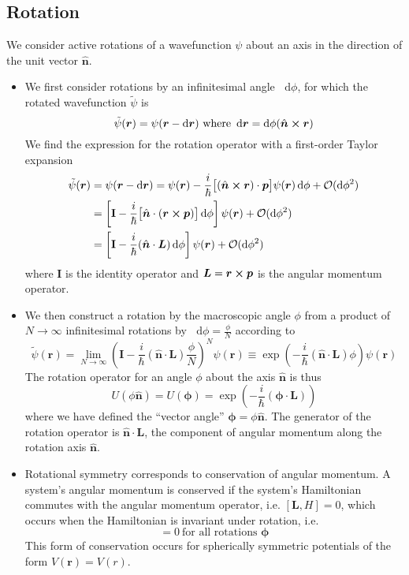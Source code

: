 \documentclass[11pt, a4paper]{article}
\newcommand{\diff}{\mathop{}\!\mathrm{d}} %
\newcommand{\Ham}{Hamiltonian\xspace}
\renewcommand{\vec}[1]{\bm{#1}}  %
\newcommand{\mat}[1]{\mathbf{#1}}  %
\newcommand{\uvec}[1]{\hat{\vec{#1}}}  %
\renewcommand{\t}[1]{\tilde{#1}}
\renewcommand{\r}{\vec{r}}  %
\newcommand{\p}{\psi}  %
\begin{document}
\subsection{Rotation}
We consider active rotations of a wavefunction $ \psi $ about an axis in the direction of the unit vector $ \uvec{n} $. 
\begin{itemize}
	\item We first consider rotations by an infinitesimal angle $ \diff \phi $, for which the rotated wavefunction $ \t{\p} $ is
	\begin{equation*}
		\t{\p}(\r) = \p(\r - \diff \r) \ \text{where } \diff \r = \diff \phi (\uvec{n} \cross \r)
	\end{equation*}
	We find the expression for the rotation operator with a first-order Taylor expansion
	\begin{align*}
		\t{\p}(\r) &= \p(\r - \diff \r) = \p(\r) - \frac{i}{\hbar}\big[(\uvec{n}\cross \r) \cdot \vec{p}\big]\p(\r)\diff \phi + \mathcal{O} (\diff \phi^{2})\\
		& = \left[\mat{I} - \frac{i}{\hbar}\big[\uvec{n}\cdot (\r \cross \vec{p})\big]\diff \phi\right] \p(\r)  + \mathcal{O} (\diff \phi^{2})\\
		& = \left[\mat{I} - \frac{i}{\hbar}(\uvec{n}\cdot \vec{L})\diff \phi\right] \p(\r) + \mathcal{O} (\diff \phi^{2})
	\end{align*}
	where $ \mat{I} $ is the identity operator and $ \vec{L} = \r \cross \vec{p} $ is the angular momentum operator. 
	
	\item We then construct a rotation by the macroscopic angle $ \phi $ from a product of $ N \to \infty $ infinitesimal rotations by $ \diff \phi = \frac{\phi}{N} $ according to 
	\begin{equation*}
		\tilde{\p}(\r) = \lim_{N \to \infty} \left(\mat{I} - \frac{i}{\hbar}(\uvec{n}\cdot \vec{L})  \frac{\phi}{N} \right)^{N}\p(\r) \equiv \exp(- \frac{i}{\hbar}(\uvec{n}\cdot \vec{L})\phi) \p(\r)
	\end{equation*}
	The rotation operator for an angle $ \phi $ about the axis $ \uvec{n} $ is thus
	\begin{equation*}
		U(\phi \uvec{n}) = U(\vec{\phi}) = \exp(- \frac{i}{\hbar}(\vec{\phi}\cdot \vec{L})) 
	\end{equation*}
	where we have defined the ``vector angle'' $ \vec{\phi} = \phi \uvec{n} $. The generator of the rotation operator is $ \uvec{n} \cdot \vec{L} $, the component of angular momentum along the rotation axis $ \uvec{n} $. 
	
	\item Rotational symmetry corresponds to conservation of angular momentum. A system's angular momentum is conserved if the system's Hamiltonian commutes with the angular momentum operator, i.e. $ [\vec{L}, H] = 0 $, which occurs when the \Ham is invariant under rotation, i.e.
	\begin{equation*}
		[U(\vec{\phi}), H] = 0 \ \text{for all rotations } \vec{\phi}
	\end{equation*}
	This form of conservation occurs for spherically symmetric potentials of the form $ V(\r) = V(r) $.
\end{itemize}
\end{document}
